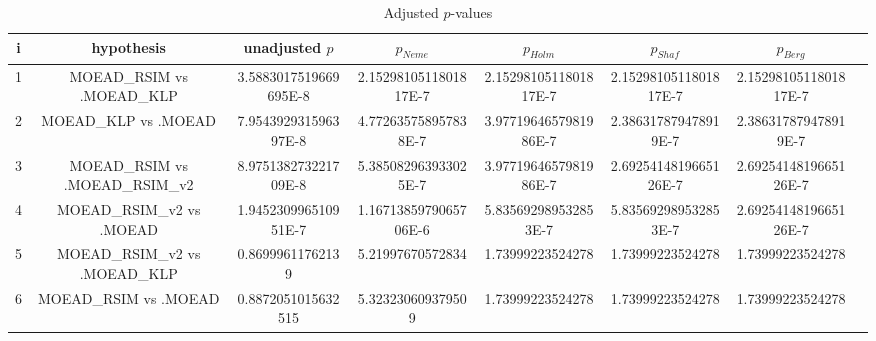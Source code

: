 \documentclass[a4paper,10pt]{article}
\begin{document}
\begin{landscape}
\begin{table}[!htp]
\centering\tiny
\caption{Adjusted $p$-values}
\begin{tabular}{cccccccc}
i&hypothesis&unadjusted $p$&$p_{Neme}$&$p_{Holm}$&$p_{Shaf}$&$p_{Berg}$\\
\hline
1&MOEAD_RSIM vs .MOEAD_KLP&3.5883017519669695E-8&2.1529810511801817E-7&2.1529810511801817E-7&2.1529810511801817E-7&2.1529810511801817E-7\\
2&MOEAD_KLP vs .MOEAD&7.954392931596397E-8&4.772635758957838E-7&3.9771964657981986E-7&2.386317879478919E-7&2.386317879478919E-7\\
3&MOEAD_RSIM vs .MOEAD_RSIM_v2&8.975138273221709E-8&5.385082963933025E-7&3.9771964657981986E-7&2.6925414819665126E-7&2.6925414819665126E-7\\
4&MOEAD_RSIM_v2 vs .MOEAD&1.945230996510951E-7&1.1671385979065706E-6&5.835692989532853E-7&5.835692989532853E-7&2.6925414819665126E-7\\
5&MOEAD_RSIM_v2 vs .MOEAD_KLP&0.86999611762139&5.21997670572834&1.73999223524278&1.73999223524278&1.73999223524278\\
6&MOEAD_RSIM vs .MOEAD&0.8872051015632515&5.323230609379509&1.73999223524278&1.73999223524278&1.73999223524278\\
\hline
\end{tabular}
\end{table}

\end{landscape}
\end{document}
